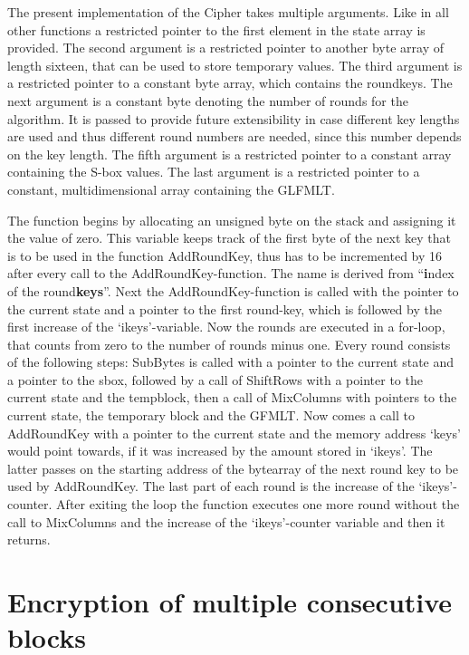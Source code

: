 The present implementation of the Cipher takes multiple arguments. Like
in all other functions a restricted pointer to the first element in the
state array is provided. The second argument is a restricted pointer to
another byte array of length sixteen, that can be used to store temporary
values. The third argument is a restricted pointer to a constant
byte array, which contains the roundkeys. The next argument is a constant
byte denoting the number of rounds for the algorithm. It is passed to
provide future extensibility in case different key lengths are used and
thus different round numbers are needed, since this number depends on
the key length. The fifth argument is a restricted pointer to a constant
array containing the S-box values. The last argument is a restricted
pointer to a constant, multidimensional array containing the GLFMLT.

The function begins by allocating an unsigned byte on the stack and
assigning it the value of zero. This variable keeps track of the first
byte of the next key that is to be used in the function AddRoundKey,
thus has to be incremented by 16 after every call to the
AddRoundKey-function. The name is derived from ``\textbf{i}ndex of the
round\textbf{keys}''. Next the AddRoundKey-function is called with the
pointer to the current state and a pointer to the first round-key, which
is followed by the first increase of the `ikeys'-variable. Now the
rounds are executed in a for-loop, that counts from zero to the number
of rounds minus one. Every round consists of the following steps:
SubBytes is called with a pointer to the current state and a pointer to
the sbox, followed by a call of ShiftRows with a pointer to the current
state and the tempblock, then a call of MixColumns with pointers to the
current state, the temporary block and the \ac{GFMLT}. Now comes a call to
AddRoundKey with a pointer to the current state and the memory address
`keys' would point towards, if it was increased by the amount stored in
`ikeys'. The latter passes on the starting address of the bytearray of
the next round key to be used by AddRoundKey. The last part of each
round is the increase of the `ikeys'-counter. After exiting the loop the
function executes one more round without the call to MixColumns and the
increase of the `ikeys'-counter variable and then it returns.

\hypertarget{encryption-of-multiple-consecutive-blocks}{%
\section{Encryption of multiple consecutive
blocks}\label{encryption-of-multiple-consecutive-blocks}}

